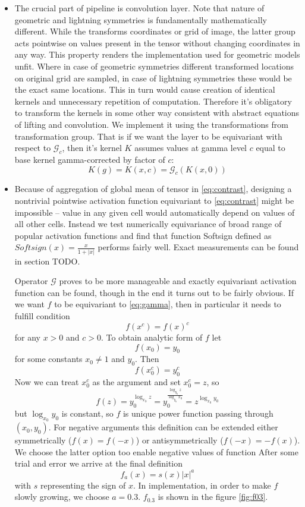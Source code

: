 \begin{itemize}
\item
The crucial part of pipeline is convolution layer. Note that nature of geometric
and lightning symmetries is fundamentally mathematically different. While the
transforms coordinates or grid of image, the latter group acts pointwise on
values present in the tensor without changing coordinates in any way.
This property renders the implementation used for geometric models unfit.
Where in case of geometric symmetries different transformed locations
on original grid are sampled, in case of lightning symmetries these would be the
exact same locations. This in turn would cause creation of identical kernels and
unnecessary repetition of computation. Therefore it's obligatory to transform the
kernels in some other way consistent with abstract equations of lifting and convolution.
We implement it using the transformations from transformation group.
That is if we want the layer to be equivariant with respect to
$\mathcal{G}_c$, then it's kernel $K$ assumes values at gamma level $c$ equal to
base kernel gamma-corrected by factor of $c$:
\begin{equation}
    K(g) = K(x,c) = \mathcal{G}_c(K(x,0))
\end{equation}

\item Because of aggregation of global mean of tensor in \ref{eq:contrast},
    designing a nontrivial pointwise activation function equivariant to \ref{eq:contrast}
    might be impossible -- value in any given cell would automatically depend on
    values of all other cells. Instead we test numerically equivariance of broad
    range of popular activation functions and find that function Softsign
    defined as $\mathit{Softsign}(x) = \frac{x}{1+|x|}$ performs fairly well.
    Exact measurements can be found in section TODO.

    Operator $\mathcal{G}$ proves to be more manageable and exactly equivariant
    activation function can be found, though in the end it turns out to be
    fairly obvious. If we want $f$ to be equivariant to \ref{eq:gamma}, then in
    particular it needs to fulfill condition $$f\left(x^c\right) =
    f\left(x\right)^c$$
    for any $x>0$ and
    $c > 0$. To obtain analytic form of $f$
    let $$f(x_0)=y_0$$ for some constants $x_0 \neq 1$ and $y_0$.
    Then $$f\left(x_0^c\right) = y_0^c$$ Now we can treat $x_0^c$ as the argument and set
    $x_0^c = z$, so $$f(z) = y_0^{\log_{x_0}z} =
    y_0^\frac{\log_{y_0}z}{\log_{y_0}{x_0}} = z^{\log_{x_0}{y_0}}$$
    but $\log_{x_0}{y_0}$ is constant, so $f$ is unique power function passing
    through $\left(x_0, y_0\right)$. For negative arguments this definition can
    be extended either symmetrically ($f(x)=f(-x)$) or antisymmetrically ($f(-x)
    = -f(x)$). We choose the latter option too enable negative values of
    function After some trial and error we arrive at the final definition $$f_a(x)
    = s(x)|x|^a$$ with $s$ representing the sign of $x$.
    In implementation, in order to make $f$ slowly growing, we
    choose $a=0.3$. $f_{0.3}$ is shown in the figure \ref{fig:f03}.


\end{itemize}
